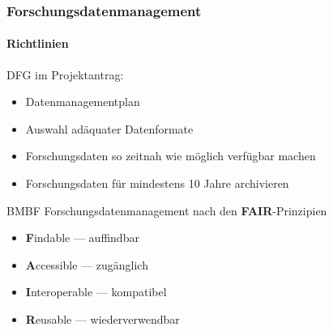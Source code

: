 \begin{frame}
    \frametitle{Forschungsdatenmanagement}
    \framesubtitle{Richtlinien}
    \begin{block}{DFG}
        im Projektantrag:
        \begin{itemize}
            \item Datenmanagementplan
            \item Auswahl adäquater Datenformate
            \item Forschungsdaten so zeitnah wie möglich verfügbar machen
            \item Forschungsdaten für mindestens 10 Jahre archivieren
        \end{itemize}
    \end{block}

    \begin{block}{BMBF}
        Forschungsdatenmanagement nach den \textbf{FAIR}-Prinzipien 
        \begin{itemize}
            \item \textbf{F}indable --- auffindbar
            \item \textbf{A}ccessible --- zugänglich 
            \item \textbf{I}nteroperable --- kompatibel
            \item \textbf{R}eusable --- wiederverwendbar
        \end{itemize}
    \end{block}
\end{frame}
